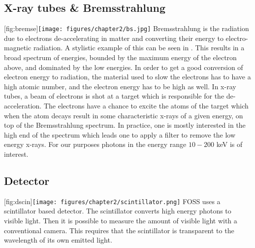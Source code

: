 \subsection{X-ray tubes \& Bremsstrahlung}
[fig:bremse]{\texttt{[image: figures/chapter2/bs.jpg]}}
Bremsstrahlung is the radiation due to electrons de-accelerating in matter and converting their energy to electro-magnetic radiation.
A stylistic example of this can be seen in .
This results in a broad spectrum of energies, bounded by the maximum energy of the electron above, and dominated by the low energies.
In order to get a good conversion of electron energy to radiation, the material used to slow the electrons has to have a high atomic number, and the electron energy has to be high as well.
In x-ray tubes, a beam of electrons is shot at a target which is responsible for the de-acceleration. The electrons have a chance to excite the atoms of the target which when the atom decays result in some characteristic x-rays of a given energy, on top of the Bremsstrahlung spectrum.
In practice, one is mostly interested in the high end of the spectrum which leads one to apply a filter to remove the low energy x-rays.
For our purposes photons in the energy range $10-200$ keV is of interest.
\subsection{Detector}
[fig:dscin]{\texttt{[image: figures/chapter2/scintillator.png]}}
FOSS uses a scintillator based detector. The scintillator converts high energy photons to visible light.
Then it is possible to measure the amount of visible light with a conventional camera. This requires that the scintillator is transparent to the wavelength of its own emitted light.

